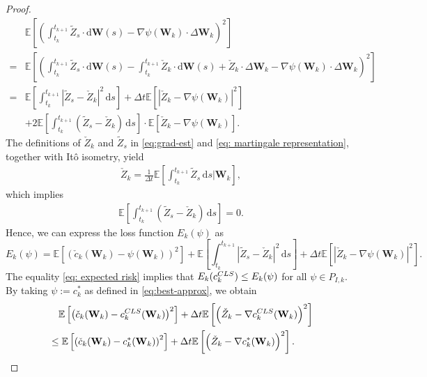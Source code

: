 \documentclass[10pt,a4paper]{amsart}
\numberwithin{equation}{section}
\numberwithin{algorithm}{section}
\theoremstyle{plain}
\theoremstyle{remark}
\newcommand{\dd}{\mathrm{d}}
\begin{document}
\begin{proof}
\begin{align*}
    & \mathbb{E}\left[ \left( \int_{t_k}^{t_{k+1}} \tilde{Z}_s\cdot \dd \mathbf{W}(s) - \nabla \psi(\mathbf{W}_k)\cdot \Delta \mathbf{W}_k \right)^2 \right] \\
    =& \mathbb{E}\left[ \left( \int_{t_k}^{t_{k+1}} \tilde{Z}_s\cdot \dd \mathbf{W}(s) - \int_{t_k}^{t_{k+1}} \check{Z}_k \cdot \dd \mathbf{W}(s) + \check{Z}_k\cdot \Delta \mathbf{W}_k - \nabla \psi(\mathbf{W}_k)\cdot \Delta \mathbf{W}_k \right)^2 \right]\\
    =& \mathbb{E}\left[ \int_{t_k}^{t_{k+1}} |\tilde{Z}_s - \check{Z}_k|^2\,\dd s \right] + \Delta t \mathbb{E}\left[ \left|\check{Z}_k - \nabla \psi(\mathbf{W}_k) \right|^2 \right] \\
    &+ 2\mathbb{E}\left[ \int_{t_k}^{t_{k+1}} (\tilde{Z}_s - \check{Z}_k)\,\dd s \right] \cdot \mathbb{E}[\check{Z}_k - \nabla \psi(\mathbf{W}_k)].
\end{align*}
The definitions of $\check{Z}_k$ and $\tilde{Z}_s$ in \cref{eq:grad-est} and \cref{eq: martingale representation}, together with It\^{o} isometry, yield
\begin{align*}
\check{Z}_k = \frac{1}{\Delta t} \mathbb{E}\left[ \int_{t_k}^{t_{k+1}} \tilde{Z}_s \,\dd s \bigg| \mathbf{W}_k \right],
\end{align*}
which implies
\begin{align*}
\mathbb{E}\left[ \int_{t_k}^{t_{k+1}} (\tilde{Z}_s - \check{Z}_k)\,\dd s \right] = 0.
\end{align*}
Hence, we can express the loss function $E_k(\psi)$ as
\begin{equation*}
    E_k(\psi) = \mathbb{E}\left[ \left( \check{c}_k(\mathbf{W}_k) - \psi(\mathbf{W}_k) \right)^2 \right] + \mathbb{E}\left[ \int_{t_k}^{t_{k+1}} |\tilde{Z}_s - \check{Z}_k|^2\,\dd s \right] + \Delta t \mathbb{E}\left[ \left|\check{Z}_k - \nabla \psi(\mathbf{W}_k) \right|^2 \right].
\end{equation*}
The equality \cref{eq: expected risk} implies that $E_k(c_k^{\rm CLS}) \le E_k(\psi)$ for all $\psi\in P_{I,k}$. By taking $\psi := c_k^*$ as defined in \cref{eq:best-approx}, we obtain
\begin{align*}
    &\quad \mathbb{E}\left[ \left( \check{c}_k(\mathbf{W}_k) - c_k^{\rm CLS}(\mathbf{W}_k) \right)^2 \right] + \Delta t \mathbb{E}\left[ \left(\check{Z}_k - \nabla c_k^{\rm CLS}(\mathbf{W}_k) \right)^2 \right] \\
    &\le \mathbb{E}\left[ \left( \check{c}_k(\mathbf{W}_k) - c_k^*(\mathbf{W}_k) \right)^2 \right] + \Delta t \mathbb{E}\left[ \left(\check{Z}_k - \nabla c_k^*(\mathbf{W}_k) \right)^2 \right].

\end{align*}
\end{proof}
\end{document}
